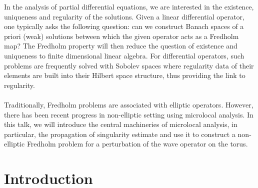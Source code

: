 \documentclass{article}
\begin{document}

In the analysis of partial differential equations, we are interested in the existence, uniqueness and regularity of the solutions. Given a linear differential operator, one typically asks the following question: can we construct Banach spaces of a priori (weak) solutions between which the given operator acts as a Fredholm map? The Fredholm property will then reduce the question of existence and uniqueness to finite dimensional linear algebra. For differential operators, such problems are frequently solved with Sobolev spaces where regularity data of their elements are built into their Hilbert space structure, thus providing the link to regularity. \\
\\
Traditionally, Fredholm problems are associated with elliptic operators. However, there has been recent progress in non-elliptic setting using microlocal analysis. In this talk, we will introduce the central machineries of microlocal analysis, in particular, the propagation of singularity estimate and use it to construct a non-elliptic Fredholm problem for a perturbation of the wave operator on the torus.



\section{Introduction}
\end{document}

